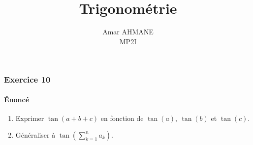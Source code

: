 \documentclass[14pt]{article}
\title{\huge\textbf{Trigonométrie}}
\author{Amar AHMANE\\ MP2I}
\date{}
\begin{document}
    \maketitle
    \subsubsection*{Exercice 10}
    \paragraph{Énoncé} 
    \begin{enumerate}
        \item Exprimer $\tan(a+b+c)$ en fonction de $\tan(a),\ \tan(b)$ et $\tan(c)$.
        \item Généraliser à $\tan\left(\sum_{k=1}^na_k\right)$.
    \end{enumerate}
    
\end{document}
